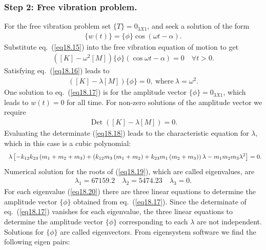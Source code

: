\documentclass{AeroStructure-ERJohnson}
\begin{document}
\subsubsection{Step 2: Free vibration problem.} For the free vibration problem set $\{T\}=0_{3 X 1}$, and seek a solution of the form
\begin{align}\label{eq18.15}
\{w(t)\}=\{\phi\} \cos (\omega t-\alpha).
\end{align}
Substitute eq.~(\ref{eq18.15}) into the free vibration equation of motion to get
\begin{align}\label{eq18.16}
\left([K]-\omega^{2}[M]\right)\{\phi\}(\cos \omega t-\alpha)=0 \quad \forall t>0.
\end{align}
Satisfying eq.~(\ref{eq18.16}) leads to
\begin{align}\label{eq18.17}
([K]-\lambda[M])\{\phi\}=0,\ \text{where}\ \lambda=\omega^{2}.
\end{align}
One solution to eq.~(\ref{eq18.17}) is for the amplitude vector $\{\phi\}=0_{3 X 1}$, which leads to $w(t)=0$ for all time. For non-zero solutions of the amplitude vector we require
\begin{align}\label{eq18.18}
\operatorname{Det}([K]-\lambda[M])=0.
\end{align}
Evaluating the determinate (\ref{eq18.18}) leads to the characteristic equation for $\lambda$, which in this case is a cubic polynomial:
\begin{align}\label{eq18.19}
\hspace*{6pt}\lambda\left[-k_{12} k_{23}\left(m_{1}+m_{2}+m_{3}\right)+\left(k_{12} m_{3}\left(m_{1}+m_{2}\right)+k_{23} m_{1}\left(m_{2}+m_{3}\right)\right) \lambda-m_{1} m_{2} m_{3} \lambda^{2}\right]=0.
\end{align}
Numerical solution for the roots of (\ref{eq18.19}), which are called eigenvalues, are
\begin{align}\label{eq18.20}
\lambda_{1}=67159.2 \quad \lambda_{2}=5474.23 \quad \lambda_{3}=0.
\end{align}
For each eigenvalue (\ref{eq18.20}) there are three linear equations to determine the amplitude vector $\{\phi\}$ obtained from eq.~(\ref{eq18.17}). Since the determinate of eq.~(\ref{eq18.17}) vanishes for each eigenvalue, the three linear equations to determine the amplitude vector $\{\phi\}$ corresponding to each $\lambda$ are not independent. Solutions for $\{\phi\}$ are called eigenvectors. From eigensystem software we find the following eigen pairs:
\end{document}
